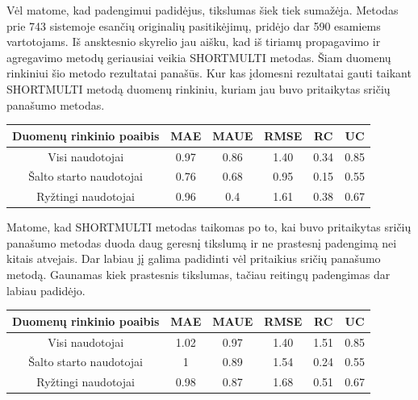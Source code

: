 \documentclass{VUMIFInfMagistrinis}
\begin{document}
Vėl matome, kad padengimui padidėjus, tikslumas šiek tiek sumažėja. Metodas prie 743 sistemoje esančių originalių pasitikėjimų, pridėjo dar 590 esamiems vartotojams.
\newline
\indent
Iš ansktesnio skyrelio jau aišku, kad iš tiriamų propagavimo ir agregavimo metodų geriausiai veikia SHORTMULTI metodas. Šiam duomenų rinkiniui šio metodo rezultatai panašūs. Kur kas įdomesni rezultatai gauti taikant SHORTMULTI metodą duomenų rinkiniu, kuriam jau buvo pritaikytas sričių panašumo metodas. 
\begin{center}
	\begin{tabular}{||c c c c c c||} 
		Duomenų rinkinio poaibis & MAE & MAUE & RMSE & RC & UC \\
		\hline
		Visi naudotojai & 0.97 & 0.86 & 1.40 & 0.34 & 0.85 \\
		\hline
		Šalto starto naudotojai & 0.76 & 0.68 & 0.95 & 0.15 & 0.55 \\
		\hline
		Ryžtingi naudotojai & 0.96 & 0.4 & 1.61 & 0.38 & 0.67 \\
	\end{tabular}
\end{center}
Matome, kad SHORTMULTI metodas taikomas po to, kai buvo pritaikytas sričių panašumo metodas duoda daug geresnį tikslumą ir ne prastesnį padengimą nei kitais atvejais. Dar labiau jį galima padidinti vėl pritaikius sričių panašumo metodą. Gaunamas kiek prastesnis tikslumas, tačiau reitingų padengimas dar labiau padidėjo.
\begin{center}
	\begin{tabular}{||c c c c c c||} 
		Duomenų rinkinio poaibis & MAE & MAUE & RMSE & RC & UC \\
		\hline
		Visi naudotojai & 1.02 & 0.97 & 1.40 & 1.51 & 0.85 \\
		\hline
		Šalto starto naudotojai & 1 & 0.89 & 1.54 & 0.24 & 0.55 \\
		\hline
		Ryžtingi naudotojai & 0.98 & 0.87 & 1.68 & 0.51 & 0.67 \\
	\end{tabular}
\end{center}
\end{document}
